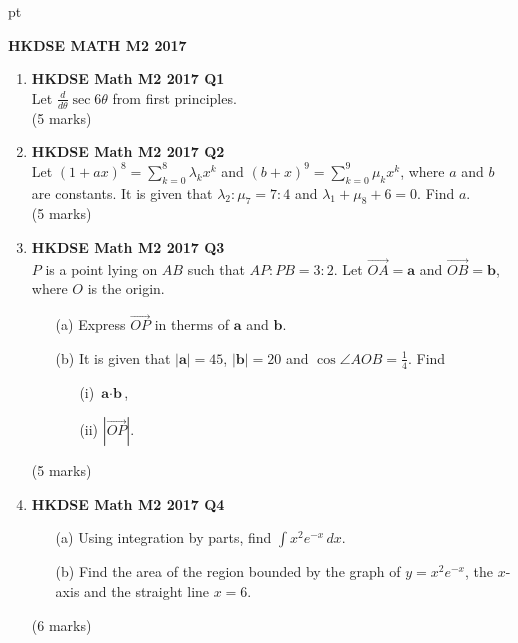 \documentclass[12pt]{article}
\begin{document}
 pt
\begin{center}
	{\large \bf HKDSE MATH M2 2017}\\
	\vspace{2 mm}

\end{center}
\vspace{0.05cm}

\begin{enumerate}
	\item \textbf{HKDSE Math M2 2017 Q1}\\
	Let $\displaystyle \frac{d}{d\theta} \sec{6\theta}$ from first principles. \\(5 marks)


	\item \textbf{HKDSE Math M2 2017 Q2}\\
	Let $\displaystyle(1+ax)^8 = \sum_{k = 0}^{8} \lambda _{k} x^{k}$ and $\displaystyle(b+x)^9 = \sum_{k = 0}^{9} \mu _{k} x^{k}$, where $a$ and $b$ are constants. It is given that $\lambda_2 : \mu_7 = 7:4$ and $\lambda_1 + \mu_8  + 6 = 0$. Find $a$.  \\(5 marks)


	\item \textbf{HKDSE Math M2 2017 Q3}\\
	$P$ is a point lying on $AB$ such that $AP : PB = 3:2$. Let $\overrightarrow{OA} = \textbf{a}$ and $\overrightarrow{OB} = \textbf{b}$, where $O$ is the origin.
	\begin{enumerate}
		\item [(a)] Express $\overrightarrow{OP} $ in therms of $ \textbf{a}$ and $ \textbf{b}$.
		\item [(b)] It is given that $|\textbf{a}| = 45$, $|\textbf{b}| = 20$ and $\cos{\angle{AOB}} = \displaystyle\frac{1}{4}$. Find
		\begin{enumerate}
			\item [(i)] $\textbf{a}   \cdot  \textbf{b} $, 
			\item [(ii)] $|\overrightarrow{OP}| $. 
		\end{enumerate}
	\end{enumerate}
	(5 marks)

	\item \textbf{HKDSE Math M2 2017 Q4}	
	\begin{enumerate}
		\item [(a)]Using integration by parts, find $\displaystyle\int x^2 e^{-x} \,dx$. 
		\item [(b)]Find the area of the region bounded by the graph of $y = x^2 e^{-x}$, the $x$-axis and the straight line $x = 6$.
	\end{enumerate}
	(6 marks)


\end{enumerate}
\end{document}
